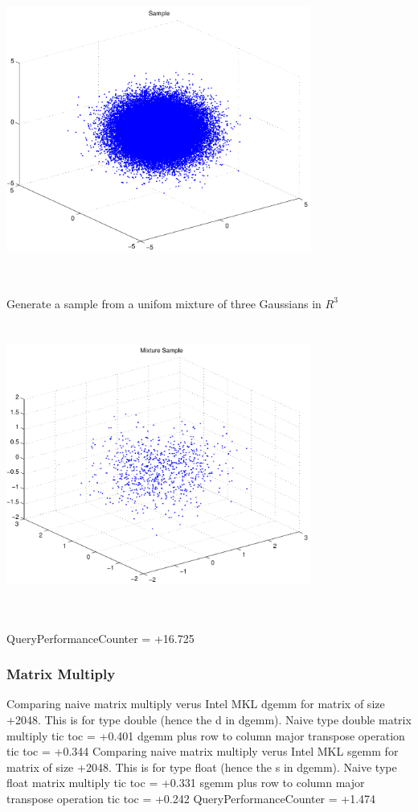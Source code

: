 \documentclass[9pt]{article}
\theoremstyle{plain}
\theoremstyle{definition}
\theoremstyle{remark}
\numberwithin{equation}{section}
\begin{document}
\includegraphics[width=10.0cm,height=10.0cm]{R_3_Normal.pdf}

Generate a sample from a unifom mixture of three Gaussians in $R^3$
\includegraphics[width=10.0cm,height=10.0cm]{R_3_Normal_Mixture.pdf}

QueryPerformanceCounter  =  +16.725
\subsubsection{Matrix Multiply}
Comparing naive matrix multiply verus Intel MKL dgemm for matrix of size +2048.
This is for type double (hence the d in dgemm).
Naive type double matrix multiply tic toc  =  +0.401
dgemm plus row to column major transpose operation tic toc  =  +0.344
Comparing naive matrix multiply verus Intel MKL sgemm for matrix of size +2048.
This is for type float (hence the s in dgemm).
Naive type float matrix multiply tic toc  =  +0.331
sgemm plus row to column major transpose operation tic toc  =  +0.242
QueryPerformanceCounter  =  +1.474
\end{document}
